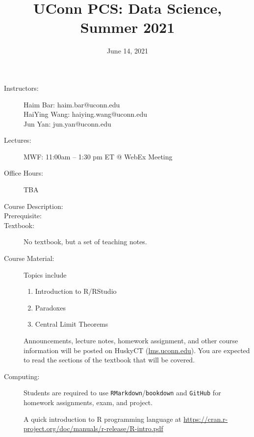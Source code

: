 \documentclass[11pt, twocolumn]{article}
\begin{document}
\title{UConn PCS: Data Science, Summer 2021}
\date{June 14, 2021}
\maketitle

\thispagestyle{fancy}


\begin{description}
\item[Instructors:]\hspace{0pt}

  Haim Bar: haim.bar@uconn.edu\\
  HaiYing Wang: haiying.wang@uconn.edu\\
  Jun Yan: jun.yan@uconn.edu

\item[Lectures:] 
  MWF: 11:00am -- 1:30 pm ET @ WebEx Meeting

\item[Office Hours:] 
  TBA


\item[Course Description:]

\item[Prerequisite:]
 

\item[Textbook:] 
  No textbook, but a set of teaching notes.

\item[Course Material:]

Topics include
\begin{enumerate}[noitemsep]
\item
  Introduction to R/RStudio
\item
  Paradoxes
\item
  Central Limit Theorems
\end{enumerate}

Announcements, lecture notes, homework assignment, and other course
information will be posted on HuskyCT (\url{lms.uconn.edu}). 
You are expected to read the sections of the textbook that will be covered.

\item[Computing:]
Students are required to use \texttt{RMarkdown}/\texttt{bookdown} and
\texttt{GitHub} for homework assignments, exam, and project.


A quick introduction to R programming language at
\url{https://cran.r-project.org/doc/manuals/r-release/R-intro.pdf}


\end{description}
\end{document}
